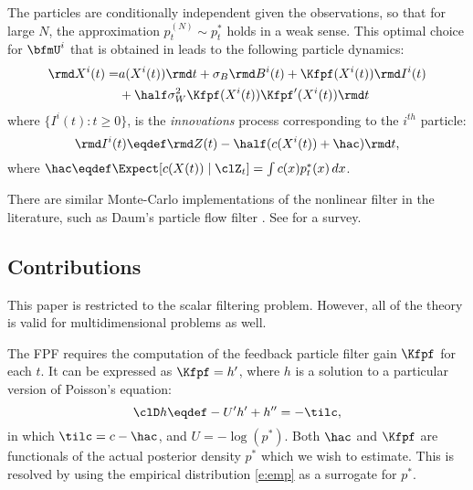 The particles are conditionally independent given the observations, so that for large $N$,  the approximation $p_t^{(N)}\sim p_t^*$ holds in a weak sense.    This optimal choice for  $\bfmU^i$ that is obtained in  \cite{yanmehmey13} leads to the following particle dynamics:
\begin{equation}
\begin{aligned}
\rmd  X^i(t)  =   & a(X^i(t))  \rmd  t  + \sigma_{B}\rmd B^i(t) + \Kfpf (X^i(t))\rmd I^i(t)  \\ & +  \half \sigma_{W}^{2}  \Kfpf (X^i(t)) \Kfpf'(X^i(t)) \rmd t
\end{aligned}
\label{particle_propagation}
\end{equation}
where $\{ I^i(t) : t\ge 0\}$, is the \textit{innovations} process corresponding to the $i^{th}$ particle:
\begin{equation*}
\rmd I^i(t) \eqdef   \rmd Z(t)- \half (c(X^i(t))+\hac)\rmd t,
\end{equation*}
where $\hac\eqdef \Expect [c(X(t)) \mid \clZ_t ] = \int c(x) p_t^*(x)\, dx$.


There are similar Monte-Carlo implementations of the nonlinear filter in the literature, such as   Daum's particle flow filter \cite{DaumHuang10}.   See \cite{taoyang_acc14} for a survey.


\subsection{Contributions}

This paper is restricted to the scalar filtering problem. However, all of the theory is valid for multidimensional problems as well.

The FPF requires the computation of the feedback particle filter gain $\Kfpf$ for each $t$. It can be expressed as $\Kfpf= h'$, where $h$ is a solution to a particular version of Poisson's equation:
\begin{equation}
\clD h
\eqdef
-U' h'+ h'' = -\tilc ,
\label{eq_fish}
\end{equation}
in which $\tilc = c - \hac$,  and $U = -\log(p^*) $.
Both $\hac$ and $\Kfpf$ are functionals of the actual posterior density $p^*$  which we wish to estimate.  This is resolved by using the empirical distribution \eqref{e:emp} as a surrogate for $p^*$.


